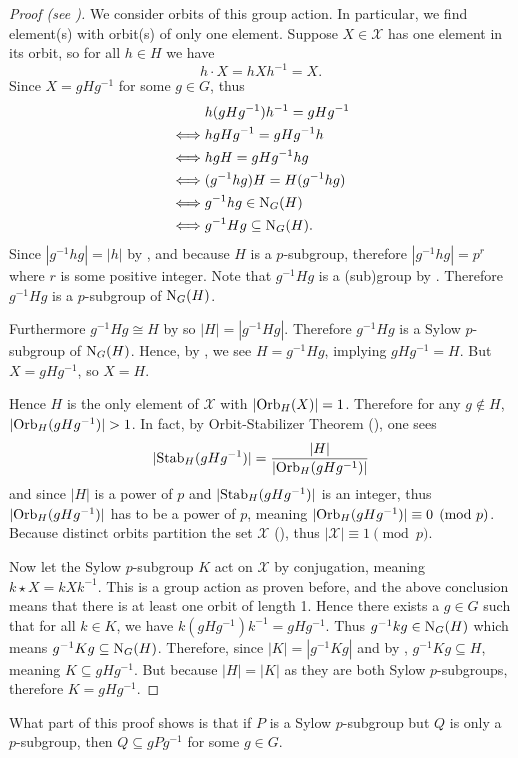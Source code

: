 \begin{proof}[Proof (see {\cite[Theorem 11.10]{humphreys_1996}})]
    We consider orbits of this group action. In particular, we find element(s) with orbit(s) of only one element. Suppose $X \in \mathcal{X}$ has one element in its orbit, so for all $h \in H$ we have
    \[
        h\cdot X = hXh^{-1} = X.    
    \]
    Since $X = gHg^{-1}$ for some $g \in G$, thus
    \begin{align*}
        &h(gHg^{-1})h^{-1} = gHg^{-1}\\
        \iff&hgHg^{-1} = gHg^{-1}h\\
        \iff&hgH = gHg^{-1}hg\\
        \iff&(g^{-1}hg)H = H(g^{-1}hg)\\
        \iff&g^{-1}hg \in \mathrm{N}_{G}(H)\\
        \iff&g^{-1}Hg \subseteq \mathrm{N}_{G}(H).
    \end{align*}
    Since $|g^{-1}hg| = |h|$ by , and because $H$ is a $p$-subgroup, therefore $|g^{-1}hg| = p^r$ where $r$ is some positive integer. Note that $g^{-1}Hg$ is a (sub)group by . Therefore $g^{-1}Hg$ is a $p$-subgroup of $\mathrm{N}_{G}(H)$.
    
    Furthermore $g^{-1}Hg \cong H$ by  so $|H| = |g^{-1}Hg|$. Therefore $g^{-1}Hg$ is a Sylow $p$-subgroup of $\mathrm{N}_{G}(H)$. Hence, by , we see $H = g^{-1}Hg$, implying $gHg^{-1} = H$. But $X = gHg^{-1}$, so $X = H$.
    
    Hence $H$ is the only element of $\mathcal{X}$ with $|\mathrm{Orb}_{H}(X)| = 1$. Therefore for any $g \notin H$, $|\mathrm{Orb}_{H}(gHg^{-1})| > 1$. In fact, by Orbit-Stabilizer Theorem (), one sees
    \[
        |\mathrm{Stab}_{H}(gHg^{-1})| = \frac{|H|}{|\mathrm{Orb}_{H}(gHg^{-1})|}
    \]
    and since $|H|$ is a power of $p$ and $|\mathrm{Stab}_{H}(gHg^{-1})|$ is an integer, thus $|\mathrm{Orb}_{H}(gHg^{-1})|$ has to be a power of $p$, meaning $|\mathrm{Orb}_{H}(gHg^{-1})| \equiv 0 \pmod p$. Because distinct orbits partition the set $\mathcal{X}$ (), thus $|\mathcal{X}| \equiv 1 \pmod p$.

    Now let the Sylow $p$-subgroup $K$ act on $\mathcal{X}$ by conjugation, meaning $k \star X = kXk^{-1}$. This is a group action as proven before, and the above conclusion means that there is at least one orbit of length 1. Hence there exists a $g \in G$ such that for all $k \in K$, we have $k(gHg^{-1})k^{-1} = gHg^{-1}$. Thus $g^{-1}kg \in \mathrm{N}_{G}(H)$ which means $g^{-1}Kg \subseteq \mathrm{N}_{G}(H)$. Therefore, since $|K| = |g^{-1}Kg|$ and by , $g^{-1}Kg \subseteq H$, meaning $K \subseteq gHg^{-1}$. But because $|H| = |K|$ as they are both Sylow $p$-subgroups, therefore $K = gHg^{-1}$.
\end{proof}
\begin{remark}
    What part of this proof shows is that if $P$ is a Sylow $p$-subgroup but $Q$ is only a $p$-subgroup, then $Q \subseteq gPg^{-1}$ for some $g \in G$.
\end{remark}

